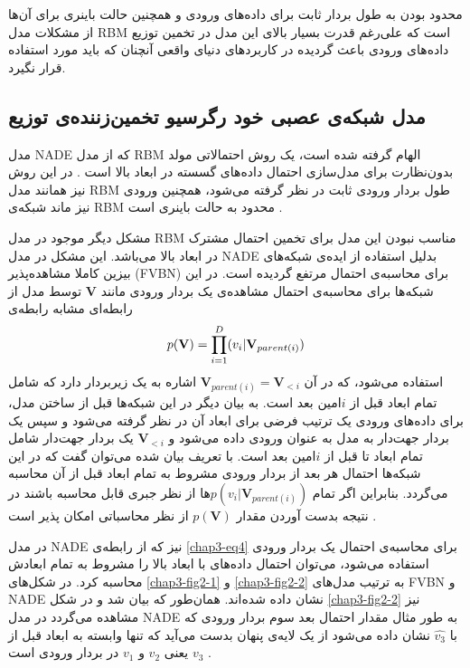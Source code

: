 محدود بودن به طول بردار ثابت برای داده‌های ورودی و همچنین حالت باینری برای آن‌ها از مشکلات مدل
RBM
است که علی‌رغم قدرت بسیار بالای این مدل در تخمین توزیع داده‌های ورودی باعث گردیده در کاربردهای دنیای واقعی‌ آنچنان که باید مورد استفاده قرار نگیرد.
	
	\subsection{مدل شبکه‌‌ی عصبی خود رگرسیو تخمین‌زننده‌ی توزیع }
	\label{chap3sec2sub2}
	مدل
	NADE
	که از مدل
	RBM
	الهام گرفته شده است، یک روش احتمالاتی مولد بدون‌نظارت برای مدل‌سازی احتمال داده‌های گسسته در ابعاد بالا است
	\cite{larochelle2011neural}.
	 در این روش نیز همانند مدل
	RBM
	طول بردار ورودی ثابت در نظر گرفته می‌‌شود، همچنین ورودی نیز ماند شبکه‌ی
	RBM
	محدود به حالت باینری است
	\cite{larochelle2011neural}.
	
	 مشکل دیگر موجود در مدل
	RBM
	 مناسب نبودن این مدل برای تخمین احتمال مشترک در ابعاد بالا می‌باشد. این مشکل در مدل
	NADE 
	بدلیل استفاده از ایده‌ی شبکه‌های بیزین کاملا مشاهده‌پذیر
		(FVBN)
	\cite{dayan1996does}\cite{bengio1999modeling}
	برای محاسبه‌ی احتمال مرتفع گردیده است. در این شبکه‌ها برای محاسبه‌ی احتمال مشاهده‌ی یک بردار ورودی مانند
	$\textbf{V}$
	توسط مدل از رابطه‌ای مشابه رابطه‌ی
	\begin{align}
		\centering
		\label{chap3-eq4}
		p(\textbf{V}) = \prod_{i=1}^{D}(v_i|\textbf{V}_{parent(i)})
	\end{align}
	استفاده می‌‌شود، که در آن
	$\textbf{V}_{parent(i)} = \textbf{V}_{<i}$
	اشاره به یک زیربردار دارد که شامل تمام ابعاد قبل از
	$i$امین 
بعد است. به بیان دیگر در این شبکه‌ها قبل از ساختن مدل، برای داده‌های ورودی یک ترتیب فرضی‌ برای ابعاد آن در نظر گرفته می‌‌شود و سپس یک بردار جهت‌دار به مدل به عنوان ورودی داده می‌‌شود و
	$\textbf{V}_{<i}$
	 یک بردار جهت‌دار شامل تمام ابعاد تا قبل از
	$i$امین 
	بعد است. با تعریف بیان شده می‌‌توان گفت که در این شبکه‌ها احتمال هر بعد از بردار ورودی مشروط به تمام ابعاد قبل از آن محاسبه می‌گردد. بنابراین اگر تمام
	$p(v_i|\textbf{V}_{parent(i)})$ها
	از نظر جبری قابل محاسبه باشند در نتیجه بدست آوردن مقدار
	$p(\textbf{V})$
	از نظر محاسباتی امکان پذیر است
	\cite{larochelle2011neural}.
	
	در مدل
	NADE
	نیز که از رابطه‌ی
	\ref{chap3-eq4}
	برای محاسبه‌ی احتمال یک بردار ورودی استفاده می‌شود، می‌‌توان احتمال داده‌های با ابعاد بالا را مشروط به تمام ابعادش محاسبه کرد. در شکل‌های
	\ref{chap3-fig2-1}
	و
	\ref{chap3-fig2-2}
	به ترتیب مدل‌های
	FVBN
	و
	NADE
	نشان داده شده‌اند. همان‌طور که بیان شد و در شکل
	\ref{chap3-fig2-2}
	نیز مشاهده می‌‌گردد در مدل
	NADE
	به طور مثال مقدار احتمال بعد سوم بردار ورودی که با
	$\hat{v_3}$
	نشان داده می‌‌شود از یک لایه‌ی پنهان بدست می‌‌آید که تنها وابسته به ابعاد قبل از
	$v_3$
	یعنی‌
	$v_2$
	و
	$v_1$
	در بردار ورودی است
	\cite{larochelle2011neural}.

